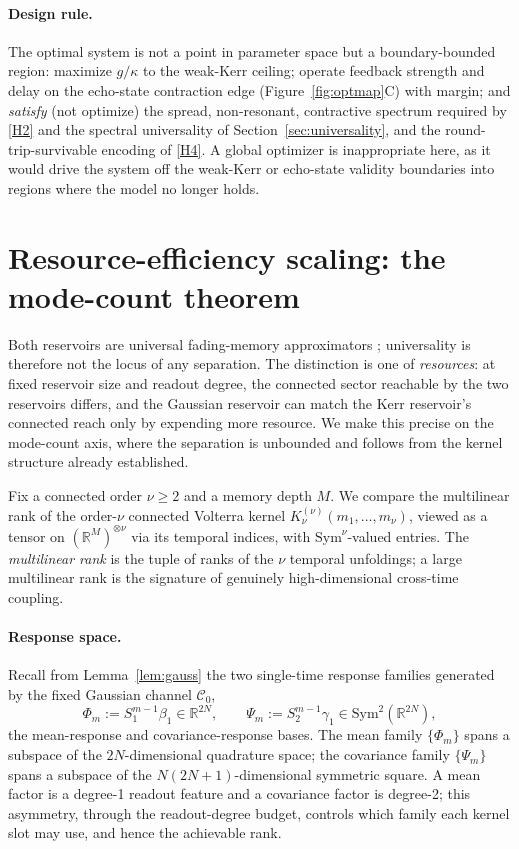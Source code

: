 \documentclass[11pt]{article}
\theoremstyle{remark}
\newcommand{\Sym}{\mathrm{Sym}}
\begin{document}
\paragraph{Design rule.}
The optimal system is not a point in parameter space but a boundary-bounded
region: maximize $g/\kappa$ to the weak-Kerr ceiling; operate feedback strength
and delay on the echo-state contraction edge (Figure~\ref{fig:optmap}C) with
margin; and \emph{satisfy} (not optimize) the spread, non-resonant, contractive
spectrum required by \ref{H2} and the spectral universality of
Section~\ref{sec:universality}, and the round-trip-survivable encoding of
\ref{H4}. A global optimizer is inappropriate here, as it would drive the system
off the weak-Kerr or echo-state validity boundaries into regions where the model
no longer holds.

\section{Resource-efficiency scaling: the mode-count theorem}
\label{sec:scaling}

Both reservoirs are universal fading-memory approximators
\cite{nokkala2021}; universality is therefore not the locus of any separation.
The distinction is one of \emph{resources}: at fixed reservoir size and readout
degree, the connected sector reachable by the two reservoirs differs, and the
Gaussian reservoir can match the Kerr reservoir's connected reach only by
expending more resource. We make this precise on the mode-count axis, where the
separation is unbounded and follows from the kernel structure already established.

Fix a connected order $\nu\ge2$ and a memory depth $M$. We compare the
multilinear rank of the order-$\nu$ connected Volterra kernel
$K^{(\nu)}_\nu(m_1,\dots,m_\nu)$, viewed as a tensor on
$(\mathbb{R}^M)^{\otimes\nu}$ via its temporal indices, with $\Sym^\nu$-valued
entries. The \emph{multilinear rank} is the tuple of ranks of the $\nu$ temporal
unfoldings; a large multilinear rank is the signature of genuinely
high-dimensional cross-time coupling.

\paragraph{Response space.}
Recall from Lemma~\ref{lem:gauss} the two single-time response families generated
by the fixed Gaussian channel $\mathcal C_0$,
\begin{equation}
\Phi_m := S_1^{m-1}\beta_1\in\mathbb{R}^{2N},\qquad
\Psi_m := S_2^{m-1}\gamma_1\in\Sym^2(\mathbb{R}^{2N}),
\end{equation}
the mean-response and covariance-response bases. The mean family
$\{\Phi_m\}$ spans a subspace of the $2N$-dimensional quadrature space; the
covariance family $\{\Psi_m\}$ spans a subspace of the $N(2N{+}1)$-dimensional
symmetric square. A mean factor is a degree-1 readout feature and a covariance
factor is degree-2; this asymmetry, through the readout-degree budget, controls
which family each kernel slot may use, and hence the achievable rank.
\end{document}
